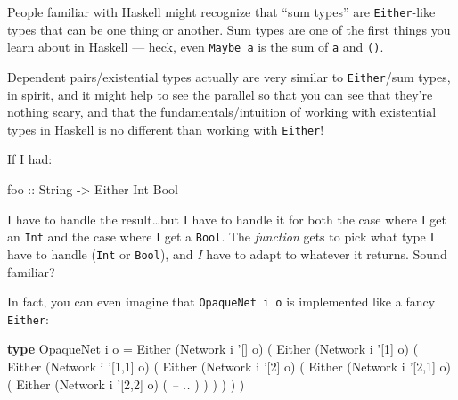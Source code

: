 \documentclass[]{article}
\newenvironment{Shaded}{}{}
\newcommand{\KeywordTok}[1]{\textcolor[rgb]{0.00,0.44,0.13}{\textbf{{#1}}}}
\newcommand{\DataTypeTok}[1]{\textcolor[rgb]{0.56,0.13,0.00}{{#1}}}
\newcommand{\CharTok}[1]{\textcolor[rgb]{0.25,0.44,0.63}{{#1}}}
\newcommand{\CommentTok}[1]{\textcolor[rgb]{0.38,0.63,0.69}{\textit{{#1}}}}
\newcommand{\OtherTok}[1]{\textcolor[rgb]{0.00,0.44,0.13}{{#1}}}
\newcommand{\FunctionTok}[1]{\textcolor[rgb]{0.02,0.16,0.49}{{#1}}}
\newcommand{\NormalTok}[1]{{#1}}
\begin{document}
People familiar with Haskell might recognize that ``sum types'' are
\texttt{Either}-like types that can be one thing or another. Sum types are one
of the first things you learn about in Haskell --- heck, even \texttt{Maybe\ a}
is the sum of \texttt{a} and \texttt{()}.

Dependent pairs/existential types actually are very similar to
\texttt{Either}/sum types, in spirit, and it might help to see the parallel so
that you can see that they're nothing scary, and that the fundamentals/intuition
of working with existential types in Haskell is no different than working with
\texttt{Either}!

If I had:

\begin{Shaded}
\begin{Highlighting}[]
\OtherTok{foo ::} \DataTypeTok{String} \OtherTok{->} \DataTypeTok{Either} \DataTypeTok{Int} \DataTypeTok{Bool}
\end{Highlighting}
\end{Shaded}

I have to handle the result\ldots{}but I have to handle it for both the case
where I get an \texttt{Int} and the case where I get a \texttt{Bool}. The
\emph{function} gets to pick what type I have to handle (\texttt{Int} or
\texttt{Bool}), and \emph{I} have to adapt to whatever it returns. Sound
familiar?

In fact, you can even imagine that \texttt{OpaqueNet\ i\ o} is implemented like
a fancy \texttt{Either}:

\begin{Shaded}
\begin{Highlighting}[]
\KeywordTok{type} \DataTypeTok{OpaqueNet} \NormalTok{i o }\FunctionTok{=} \DataTypeTok{Either} \NormalTok{(}\DataTypeTok{Network} \NormalTok{i }\CharTok{'[] o) (}
                       \DataTypeTok{Either} \NormalTok{(}\DataTypeTok{Network} \NormalTok{i }\CharTok{'[1] o) (}
                         \DataTypeTok{Either} \NormalTok{(}\DataTypeTok{Network} \NormalTok{i }\CharTok{'[1,1] o) (}
                           \DataTypeTok{Either} \NormalTok{(}\DataTypeTok{Network} \NormalTok{i }\CharTok{'[2] o) (}
                             \DataTypeTok{Either} \NormalTok{(}\DataTypeTok{Network} \NormalTok{i }\CharTok{'[2,1] o) (}
                               \DataTypeTok{Either} \NormalTok{(}\DataTypeTok{Network} \NormalTok{i }\CharTok{'[2,2] o) (}
                                 \CommentTok{-- ..}
                               \NormalTok{)}
                             \NormalTok{)}
                           \NormalTok{)}
                         \NormalTok{)}
                       \NormalTok{)}
                     \NormalTok{)}
\end{Highlighting}
\end{Shaded}
\end{document}
